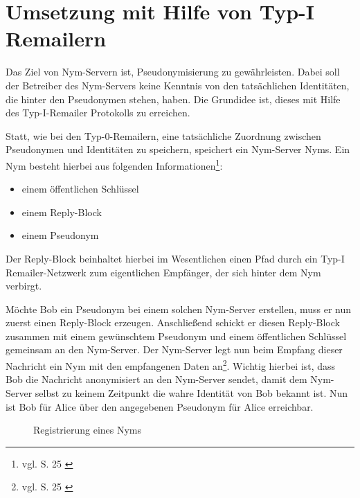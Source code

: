 \section{Umsetzung mit Hilfe von Typ-I Remailern}
Das Ziel von Nym-Servern ist, Pseudonymisierung zu gewährleisten. Dabei soll der Betreiber des Nym-Servers keine Kenntnis von den tatsächlichen Identitäten, die hinter den Pseudonymen stehen, haben. Die Grundidee ist, dieses mit Hilfe des Typ-I-Remailer Protokolls zu erreichen.

Statt, wie bei den Typ-0-Remailern, eine tatsächliche Zuordnung zwischen Pseudonymen und Identitäten zu speichern, speichert ein Nym-Server Nyms.
Ein Nym besteht hierbei aus folgenden Informationen\footnote{vgl. S. 25 \cite{loesing2009privacy}}:
\begin{itemize}
\item einem öffentlichen Schlüssel
\item einem Reply-Block
\item einem Pseudonym
\end{itemize}

Der Reply-Block beinhaltet hierbei im Wesentlichen einen Pfad durch ein Typ-I Remailer-Netzwerk zum eigentlichen Empfänger, der sich hinter dem Nym verbirgt.

Möchte Bob ein Pseudonym bei einem solchen Nym-Server erstellen, muss er nun zuerst einen Reply-Block erzeugen. Anschließend schickt er diesen Reply-Block zusammen mit einem gewünschtem Pseudonym und einem öffentlichen Schlüssel gemeinsam an den Nym-Server. Der Nym-Server legt nun beim Empfang dieser Nachricht ein Nym mit den empfangenen Daten an\footnote{vgl. S. 25 \cite{loesing2009privacy}}. Wichtig hierbei ist, dass Bob die Nachricht anonymisiert an den Nym-Server sendet, damit dem Nym-Server selbst zu keinem Zeitpunkt die wahre Identität von Bob bekannt ist. Nun ist Bob für Alice über den angegebenen Pseudonym für Alice erreichbar.

\begin{figure}
	\centering
	\begin{sequencediagram}
	\end{sequencediagram}
	\caption{Registrierung eines Nyms}
\end{figure}

